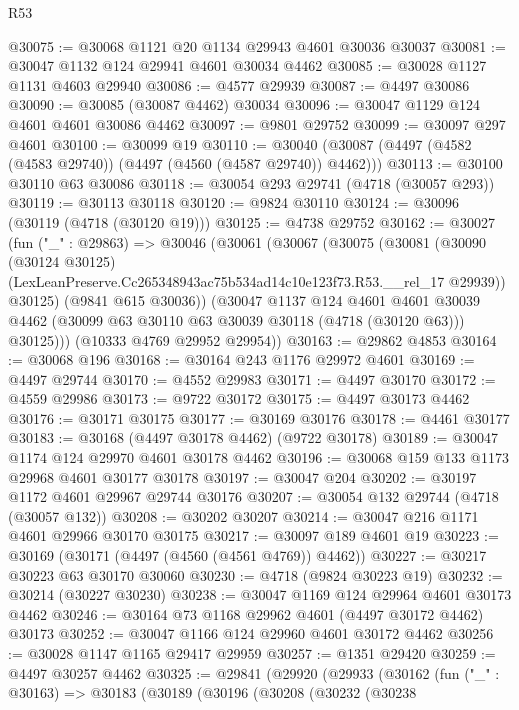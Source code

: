 \begin{lexlean}{R53}
\begin{coremodule}
@30075 := @30068 @1121 @20 @1134 @29943 @4601 @30036 @30037
@30081 := @30047 @1132 @124 @29941 @4601 @30034 @4462
@30085 := @30028 @1127 @1131 @4603 @29940
@30086 := @4577 @29939
@30087 := @4497 @30086
@30090 := @30085 (@30087 @4462) @30034
@30096 := @30047 @1129 @124 @4601 @4601 @30086 @4462
@30097 := @9801 @29752
@30099 := @30097 @297 @4601
@30100 := @30099 @19
@30110 := @30040 (@30087 (@4497 (@4582 (@4583 @29740)) (@4497 (@4560 (@4587 @29740)) @4462)))
@30113 := @30100 @30110 @63 @30086
@30118 := @30054 @293 @29741 (@4718 (@30057 @293))
@30119 := @30113 @30118
@30120 := @9824 @30110
@30124 := @30096 (@30119 (@4718 (@30120 @19)))
@30125 := @4738 @29752
@30162 := @30027
    (fun ("_" : @29863) =>
    @30046
      (@30061
        (@30067
          (@30075
            (@30081
              (@30090
                (@30124 @30125)
                (LexLeanPreserve.Cc265348943ac75b534ad14c10e123f73.R53.__rel_17 @29939))
              @30125)
            (@9841 @615 @30036))
          (@30047
            @1137
            @124
            @4601
            @4601
            @30039
            @4462
            (@30099 @63 @30110 @63 @30039 @30118 (@4718 (@30120 @63)))
            @30125)))
      (@10333 @4769 @29952 @29954))
@30163 := @29862 @4853
@30164 := @30068 @196
@30168 := @30164 @243 @1176 @29972 @4601
@30169 := @4497 @29744
@30170 := @4552 @29983
@30171 := @4497 @30170
@30172 := @4559 @29986
@30173 := @9722 @30172
@30175 := @4497 @30173 @4462
@30176 := @30171 @30175
@30177 := @30169 @30176
@30178 := @4461 @30177
@30183 := @30168 (@4497 @30178 @4462) (@9722 @30178)
@30189 := @30047 @1174 @124 @29970 @4601 @30178 @4462
@30196 := @30068 @159 @133 @1173 @29968 @4601 @30177 @30178
@30197 := @30047 @204
@30202 := @30197 @1172 @4601 @29967 @29744 @30176
@30207 := @30054 @132 @29744 (@4718 (@30057 @132))
@30208 := @30202 @30207
@30214 := @30047 @216 @1171 @4601 @29966 @30170 @30175
@30217 := @30097 @189 @4601 @19
@30223 := @30169 (@30171 (@4497 (@4560 (@4561 @4769)) @4462))
@30227 := @30217 @30223 @63 @30170 @30060
@30230 := @4718 (@9824 @30223 @19)
@30232 := @30214 (@30227 @30230)
@30238 := @30047 @1169 @124 @29964 @4601 @30173 @4462
@30246 := @30164 @73 @1168 @29962 @4601 (@4497 @30172 @4462) @30173
@30252 := @30047 @1166 @124 @29960 @4601 @30172 @4462
@30256 := @30028 @1147 @1165 @29417 @29959
@30257 := @1351 @29420
@30259 := @4497 @30257 @4462
@30325 := @29841
    (@29920
      (@29933
        (@30162
          (fun ("_" : @30163) =>
          @30183
            (@30189
              (@30196
                (@30208
                  (@30232
                    (@30238

\end{coremodule}
\end{lexlean}
